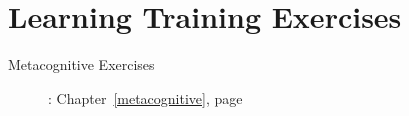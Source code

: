 \documentclass[../main.tex]{subfiles}
\begin{document}
%
\chapter{Learning Training Exercises}
\begin{description}
\item[Metacognitive Exercises]: Chapter~\ref{metacognitive}, page~\pageref{metacognitive}
\end{description}
\end{document}
